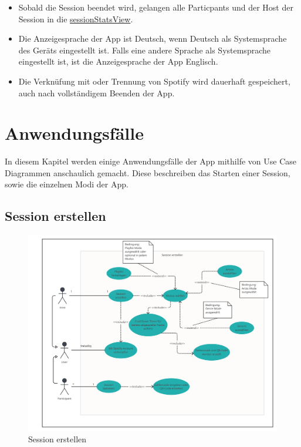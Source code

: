 \documentclass[oneside, ngerman]{sdqtechreport}
\begin{document}
\begin{itemize}
    \item Sobald die Session beendet wird, gelangen alle Particpants und der Host der Session in die \hyperlink{sessionStatsView}{sessionStatsView}.
    \item Die Anzeigesprache der App ist Deutsch, wenn Deutsch als Systemsprache des Geräts eingestellt ist. Falls eine andere Sprache als Systemsprache eingestellt ist, ist die Anzeigesprache der App Englisch.
    \item Die Verknüfung mit oder Trennung von Spotify wird dauerhaft gespeichert, auch nach vollständigem Beenden der App.
\end{itemize}






\chapter{Anwendungsfälle}
\hypertarget{Anwendungsfaelle}{}
\label{chap:Anwendungsfälle}

In diesem Kapitel werden einige Anwendungsfälle der App mithilfe von Use Case Diagrammen anschaulich gemacht. Diese beschreiben das Starten einer Session, sowie die einzelnen Modi der App.

\section{Session erstellen}
\label{sec:Anwendungsfälle:Session erstellen}
\hypertarget{Session erstellen}{}

\begin{figure}[h]
    \includegraphics[width = 16cm]{LATEX/Pflichtenheft/GraphicDesigns/Use Case Session erstellen.png}
    \caption{Session erstellen}
    \label{fig:Use Case App Start}
\end{figure}
\end{document}
